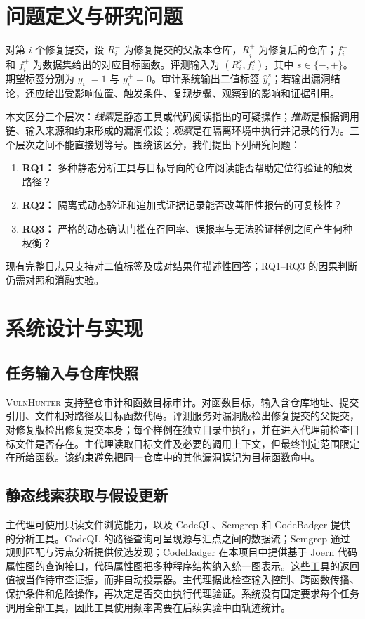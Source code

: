 \documentclass[UTF8,a4paper,11pt,fontset=fandol]{ctexart}
\newcommand{\VH}{\textsc{VulnHunter}}
\begin{document}
\section{问题定义与研究问题}
对第 $i$ 个修复提交，设 $R_i^{-}$ 为修复提交的父版本仓库，$R_i^{+}$ 为修复后的仓库；$f_i^{-}$ 和 $f_i^{+}$ 为数据集给出的对应目标函数。评测输入为 $(R_i^s,f_i^s)$，其中 $s\in\{-,+\}$。期望标签分别为 $y_i^{-}=1$ 与 $y_i^{+}=0$。审计系统输出二值标签 $\hat y_i^s$；若输出漏洞结论，还应给出受影响位置、触发条件、复现步骤、观察到的影响和证据引用。

本文区分三个层次：\emph{线索}是静态工具或代码阅读指出的可疑操作；\emph{推断}是根据调用链、输入来源和约束形成的漏洞假设；\emph{观察}是在隔离环境中执行并记录的行为。三个层次之间不能直接划等号。围绕该区分，我们提出下列研究问题：
\begin{enumerate}
  \item \textbf{RQ1：} 多种静态分析工具与目标导向的仓库阅读能否帮助定位待验证的触发路径？
  \item \textbf{RQ2：} 隔离式动态验证和追加式证据记录能否改善阳性报告的可复核性？
  \item \textbf{RQ3：} 严格的动态确认门槛在召回率、误报率与无法验证样例之间产生何种权衡？
\end{enumerate}
现有完整日志只支持对二值标签及成对结果作描述性回答；RQ1--RQ3 的因果判断仍需对照和消融实验。

\section{系统设计与实现}
\subsection{任务输入与仓库快照}
\VH{} 支持整仓审计和函数目标审计。对函数目标，输入含仓库地址、提交引用、文件相对路径及目标函数代码。评测服务对漏洞版检出修复提交的父提交，对修复版检出修复提交本身；每个样例在独立目录中执行，并在进入代理前检查目标文件是否存在。主代理读取目标文件及必要的调用上下文，但最终判定范围限定在所给函数。该约束避免把同一仓库中的其他漏洞误记为目标函数命中。

\subsection{静态线索获取与假设更新}
主代理可使用只读文件浏览能力，以及 CodeQL、Semgrep 和 CodeBadger 提供的分析工具。CodeQL 的路径查询可呈现源与汇点之间的数据流\cite{codeqlDocs}；Semgrep 通过规则匹配与污点分析提供候选发现\cite{semgrepDocs}；CodeBadger 在本项目中提供基于 Joern 代码属性图的查询接口，代码属性图把多种程序结构纳入统一图表示\cite{yamaguchi2014}。这些工具的返回值被当作待审查证据，而非自动投票器。主代理据此检查输入控制、跨函数传播、保护条件和危险操作，再决定是否交由执行代理验证。系统没有固定要求每个任务调用全部工具，因此工具使用频率需要在后续实验中由轨迹统计。
\end{document}
